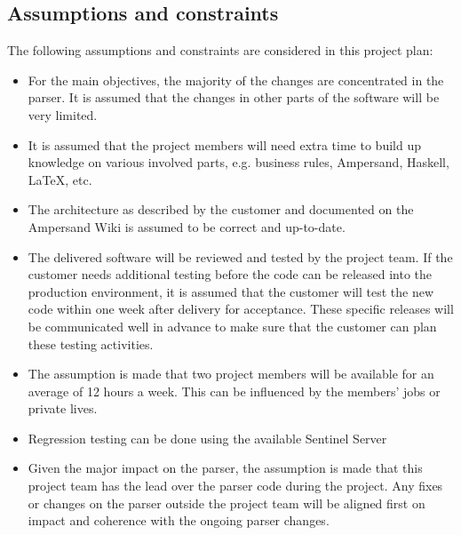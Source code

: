 \subsection{Assumptions and constraints}
\label{subsec:assumptions-constraints}
The following assumptions and constraints are considered in this project plan:
\begin{itemize}
	\item For the main objectives, the majority of the changes are concentrated in the parser.
		It is assumed that the changes in other parts of the software will be very limited.
	\item It is assumed that the project members will need extra time to build up knowledge on various involved parts, e.g. business rules, Ampersand, Haskell, LaTeX, etc.
	\item The architecture as described by the customer and documented on the Ampersand Wiki is assumed to be correct and up-to-date.
	\item The delivered software will be reviewed and tested by the project team.
	If the customer needs additional testing before the code can be released into the production environment, it is assumed that the customer will test the new code within one week after delivery for acceptance.
	These specific releases will be communicated well in advance to make sure that the customer can plan these testing activities.
	\item The assumption is made that two project members will be available for an average of 12 hours a week.
		This can be influenced by the members' jobs or private lives.
	\item Regression testing can be done using the available Sentinel Server
	\item Given the major impact on the parser, the assumption is made that this project team has the lead over the parser code during the project.
		Any fixes or changes on the parser outside the project team will be aligned first on impact and coherence with the ongoing parser changes.
\end{itemize}

